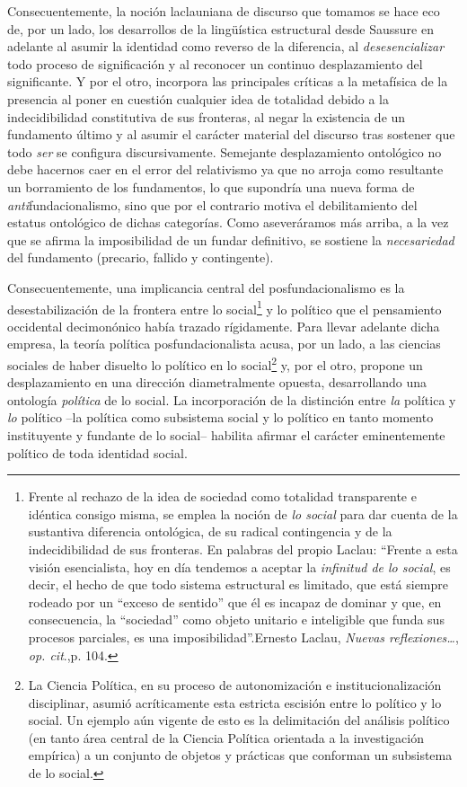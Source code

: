 Consecuentemente, la noción laclauniana de discurso que tomamos se hace
eco de, por un lado, los desarrollos de la lingüística estructural desde
Saussure en adelante al asumir la identidad como reverso de la
diferencia, al \emph{desesencializar} todo proceso de significación y al
reconocer un continuo desplazamiento del significante. Y por el otro,
incorpora las principales críticas a la metafísica de la presencia al
poner en cuestión cualquier idea de totalidad debido a la
indecidibilidad constitutiva de sus fronteras, al negar la existencia de
un fundamento último y al asumir el carácter material del discurso tras
sostener que todo \emph{ser} se configura discursivamente. Semejante
desplazamiento ontológico no debe hacernos caer en el error del
relativismo ya que no arroja como resultante un borramiento de los
fundamentos, lo que supondría una nueva forma de
\emph{anti}fundacionalismo, sino que por el contrario motiva el
debilitamiento del estatus ontológico de dichas categorías. Como
aseveráramos más arriba, a la vez que se afirma la imposibilidad de un
fundar definitivo, se sostiene la \emph{necesariedad} del fundamento
(precario, fallido y contingente).

Consecuentemente, una implicancia central del posfundacionalismo es la
desestabilización de la frontera entre lo social\footnote{Frente al
  rechazo de la idea de sociedad como totalidad transparente e idéntica
  consigo misma, se emplea la noción de \emph{lo social} para dar cuenta
  de la sustantiva diferencia ontológica, de su radical contingencia y
  de la indecidibilidad de sus fronteras. En palabras del propio Laclau:
  \enquote{Frente a esta visión esencialista, hoy en día tendemos a aceptar la
  \emph{infinitud de lo social}, es decir, el hecho de que todo sistema
  estructural es limitado, que está siempre rodeado por un ``exceso de
  sentido'' que él es incapaz de dominar y que, en consecuencia, la
  ``sociedad'' como objeto unitario e inteligible que funda sus procesos
  parciales, es una imposibilidad}.Ernesto Laclau, \emph{Nuevas
  reflexiones\ldots{}}, \emph{op. cit}.,p. 104.} y lo político que el
pensamiento occidental decimonónico había trazado rígidamente. Para
llevar adelante dicha empresa, la teoría política posfundacionalista
acusa, por un lado, a las ciencias sociales de haber disuelto lo
político en lo social\footnote{La Ciencia Política, en su proceso de
  autonomización e institucionalización disciplinar, asumió
  acríticamente esta estricta escisión entre lo político y lo social. Un
  ejemplo aún vigente de esto es la delimitación del análisis político
  (en tanto área central de la Ciencia Política orientada a la
  investigación empírica) a un conjunto de objetos y prácticas que
  conforman un subsistema de lo social.} y, por el otro, propone un
desplazamiento en una dirección diametralmente opuesta, desarrollando
una ontología \emph{política} de lo social. La incorporación de la
distinción entre \emph{la} política y \emph{lo} político --la política
como subsistema social y lo político en tanto momento instituyente y
fundante de lo social-- habilita afirmar el carácter eminentemente
político de toda identidad social.

